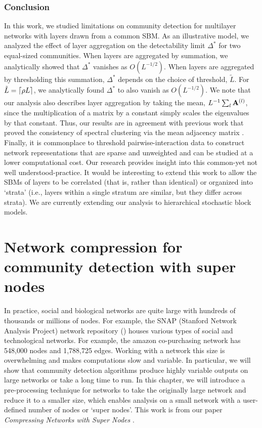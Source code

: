 \subsection{Conclusion}

In this work, we studied limitations on community detection for multilayer networks with layers drawn from a common SBM. As an illustrative model, we analyzed the effect of layer aggregation on the detectability limit $\Delta^{*}$ for two equal-sized communities. When layers are aggregated by summation, we analytically showed that $\Delta^{*}$ vanishes as $O(L^{-1/2})$. When layers are aggregated by thresholding this summation, $\Delta^{*}$ depends on the choice of threshold, $\tilde{L}$. For $\tilde{L}=\ceil*{\rho L}$, we analytically found $\Delta^{*}$ to also vanish as $O(L^{-1/2})$. We note that our analysis also describes layer aggregation by taking the mean, $L^{-1}\sum_{l}{\bf A}^{(l)}$, since the multiplication of a matrix by a constant simply scales the eigenvalues by that constant. Thus, our results are in agreement with previous work that proved the consistency of spectral clustering via the mean adjacency matrix \cite{airoldi}. \\
\indent Finally, it is commonplace to threshold pairwise-interaction data to construct network representations that are sparse and unweighted and can be studied at a lower computational cost. Our research provides insight into this common-yet not well understood-practice. It would be interesting to extend this work to allow the SBMs of layers to be correlated \cite{detect25} (that is, rather than identical) or organized into `strata' \cite{smlsbm} (i.e., layers within a single stratum are similar, but they differ across strata). We are currently extending our analysis to hierarchical stochastic block models. 

\chapter{Network compression for community detection with super nodes}
\indent In practice, social and biological networks are quite large with hundreds of thousands or millions of nodes. For example, the SNAP (Stanford Network Analysis Project) network repository (\cite{https://snap.stanford.edu/data/}) houses various types of social and technological networks. For example, the amazon co-purchasing network has 548,000 nodes and 1,788,725 edges. Working with a network this size is overwhelming and makes computations slow and variable. In particular, we will show that community detection algorithms produce highly variable outputs on large networks or take a long time to run. In this chapter, we will introduce a pre-processing technique for networks to take the originally large network and reduce it to a smaller size, which enables analysis on a small network with a user-defined number of nodes or `super nodes'. This work is from our paper \emph{Compressing Networks with Super Nodes} \cite{compressing}.

